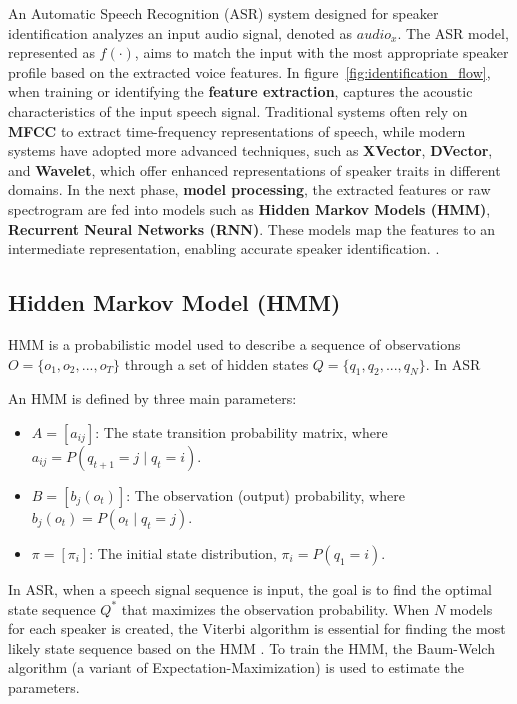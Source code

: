 \documentclass[conference]{IEEEtran}
\begin{document}
An Automatic Speech Recognition (ASR) system designed for speaker identification analyzes an input audio signal, denoted as $audio_x$.
The ASR model, represented as $f(\cdot)$, aims to match the input with the most appropriate speaker profile based on the extracted voice features.
In figure~\ref{fig:identification_flow}, when training or identifying the \textbf{feature extraction},
captures the acoustic characteristics of the input speech signal. Traditional systems often rely on \textbf{MFCC} to extract time-frequency representations of speech,
while modern systems have adopted more advanced techniques, such as \textbf{XVector}, \textbf{DVector}, and \textbf{Wavelet}, which offer enhanced representations of
speaker traits in different domains. In the next phase, \textbf{model processing}, the extracted features or raw spectrogram are fed into models such as \textbf{Hidden Markov Models (HMM)},
\textbf{Recurrent Neural Networks (RNN)}. These models map the features to an intermediate representation,
enabling accurate speaker identification. \cite{davis1980comparison, Snyder2018Xvectors,wan2018dvector,graves2013speech}.



\subsection{Hidden Markov Model (HMM)}
HMM is a probabilistic model used to describe a sequence of observations $O = \{o_1, o_2, ..., o_T\}$ through a set of hidden states $Q = \{q_1, q_2, ..., q_N\}$. In ASR

An HMM is defined by three main parameters:
\begin{itemize}
    \item $A = [a_{ij}]$: The state transition probability matrix, where $a_{ij} = P(q_{t+1} = j \mid q_t = i)$.
    \item $B = [b_j(o_t)]$: The observation (output) probability, where $b_j(o_t) = P(o_t \mid q_t = j)$.
    \item $\pi = [\pi_i]$: The initial state distribution, $\pi_i = P(q_1 = i)$.
\end{itemize}

In ASR, when a speech signal sequence is input, the goal is to find the optimal state sequence $Q^*$ that maximizes
the observation probability. When \(N\) models for each speaker is created, the Viterbi algorithm is
essential for finding the most likely state sequence based on the HMM \cite{ilyas2007speaker}.
To train the HMM, the Baum-Welch algorithm (a variant of Expectation-Maximization) is used to estimate the parameters.
\end{document}
